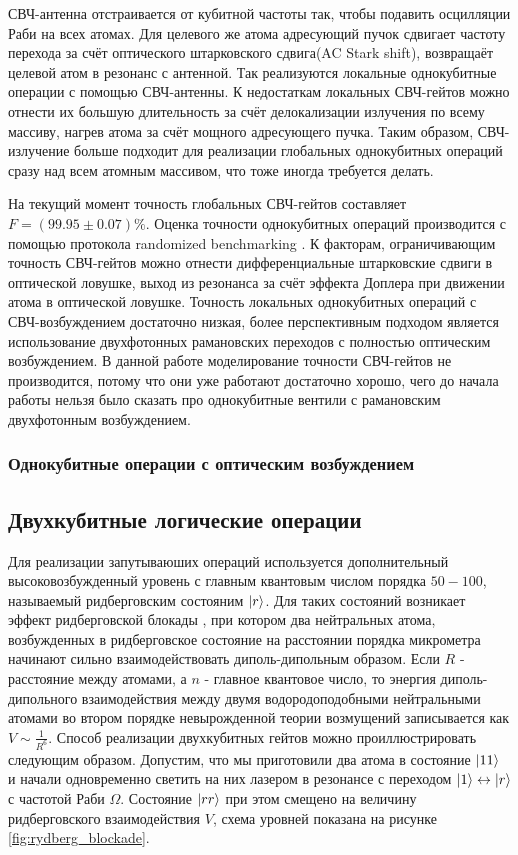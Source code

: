 СВЧ-антенна отстраивается от кубитной частоты так, чтобы подавить осцилляции Раби на всех атомах. Для целевого же атома адресующий пучок сдвигает частоту перехода за счёт оптического штарковского сдвига(AC Stark shift), возвращаёт целевой атом в резонанс с антенной. Так реализуются локальные однокубитные операции с помощью СВЧ-антенны. К недостаткам локальных СВЧ-гейтов можно отнести их большую длительность за счёт делокализации излучения по всему массиву, нагрев атома за счёт мощного адресующего пучка. Таким образом, СВЧ-излучение больше подходит для реализации глобальных однокубитных операций сразу над всем атомным массивом, что тоже иногда требуется делать. 

На текущий момент точность глобальных СВЧ-гейтов составляет $F=(99.95 \pm 0.07)\%$. Оценка точности однокубитных операций производится с помощью протокола randomized benchmarking \cite{Hines_2023,Proctor:2022aa}. К факторам, ограничивающим точность СВЧ-гейтов можно отнести дифференциальные штарковские сдвиги в оптической ловушке, выход из резонанса за счёт эффекта Доплера при движении атома в оптической ловушке. Точность локальных однокубитных операций с СВЧ-возбуждением достаточно низкая, более перспективным подходом является использование двухфотонных рамановских переходов с полностью оптическим возбуждением. 
В данной работе моделирование точности СВЧ-гейтов не производится, потому что они уже работают достаточно хорошо, чего до начала работы нельзя было сказать про однокубитные вентили с рамановским двухфотонным возбуждением. 

\subsubsection{Однокубитные операции с оптическим возбуждением}



\subsection{Двухкубитные логические операции}

Для реализации запутываюших операций используется дополнительный высоковозбужденный уровень с главным квантовым числом порядка $50-100$, называемый ридберговским состояним $\left| r \right\rangle$. Для таких состояний возникает эффект ридберговской блокады \cite{PhysRevLett.85.2208}, при котором два нейтральных атома, возбужденных в ридберговское состояние на расстоянии порядка микрометра начинают сильно взаимодействовать диполь-дипольным образом. Если $R$ - расстояние между атомами, а $n$ - главное квантовое число, то энергия диполь-дипольного взаимодействия между двумя водородоподобными нейтральными атомами во втором порядке невырожденной теории возмущений записывается как $V\sim \frac{1}{R^{6}}$. Способ реализации двухкубитных гейтов можно проиллюстрировать следующим образом. Допустим, что мы приготовили два атома в состояние $\left| 11 \right\rangle$ и начали одновременно светить на них лазером в резонансе с переходом $\left| 1 \right\rangle\leftrightarrow\left| r \right\rangle$ с частотой Раби $\Omega$. Состояние $\left| rr \right\rangle$ при этом смещено на величину ридберговского взаимодействия $V$, схема уровней показана на рисунке \ref{fig:rydberg_blockade}.

